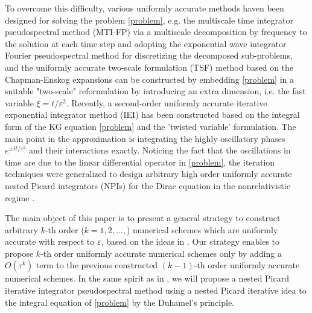 \documentclass[final,leqno,showlabe]{siamltex}
\begin{document}
To overcome this difficulty,  various  uniformly accurate methods haven been designed for solving the problem \eqref{problem},  e.g.  the multiscale time integrator pseudospectral method \cite{1multiscale:2014,multiscalegeneral:2014,2multiscale:preprint,multiandtwo:2017} (MTI-FP) via a multiscale decomposition by frequency to the solution at each time step and adopting the exponential wave integrator Fourier pseudospectral method for discretizing the decomposed sub-problems,
and the uniformly accurate two-scale formulation (TSF) method \cite{Twoscale:2015} based on the Chapman-Enskog expansions can be constructed by embedding  \eqref{problem} in a suitable "two-scale" reformulation by introducing an extra dimension, i.e. the fast  variable $\xi=t/\varepsilon^2$.
Recently, a second-order uniformly accurate iterative exponential integrator method (IEI) has been  constructed \cite{Asymptoticiterative:2018} based on the integral form of the KG equation \eqref{problem} and the 'twisted variable' formulation. The main point in the approximation is integrating the highly oscillatory phases $e^{\pm it/\varepsilon^2}$ and their interactions exactly.
Noticing the fact that the oscillations in time are due to the linear differential operator in \eqref{problem}, the iteration techniques \cite{Asymptoticiterative:2018} were generalized to
 design arbitrary high order uniformly accurate nested Picard integrators (NPIs) for the Dirac equation in the nonrelativistic regime \cite{Nested:2018}.

The main object of this paper is to present a general strategy to construct arbitrary $k$-th order ($k=1,2,\dots,$) numerical schemes which are uniformly accurate with respect to $\varepsilon$,  based on the ideas in \cite{Asymptoticiterative:2018,Nested:2018}.  Our strategy enables to propose $k$-th order uniformly accurate numerical schemes
only by adding a $O(\tau^k)$ term to the previous constructed $(k-1)$-th order uniformly accurate numerical schemes. In the same spirit as in \cite{Nested:2018}, we will propose a nested Picard iterative integrator pseudospectral method  using a nested Picard iterative idea to the integral equation of \eqref{problem} by the Duhamel's principle.
\end{document}
